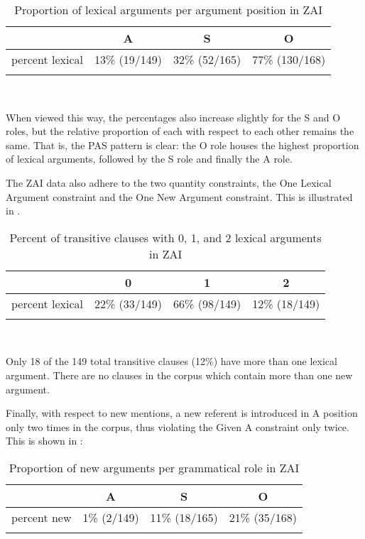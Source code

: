 \begin{table}

\caption{{Proportion of lexical arguments per argument position in ZAI}}
\begin{tabular}{ r  c  c  c }
\lsptoprule
 & A & S & O \\

\midrule
 percent lexical  &  13{\%} (19/149) &  32{\%} (52/165) &  77{\%} (130/168)  \\
  
\lspbottomrule
\end{tabular}\\
\label{proportionlexical}

\end{table}
When viewed this way, the percentages also increase slightly for the S and O roles, but the relative proportion of each with respect to each other remains the same. That is, the PAS pattern is clear: the O role houses the highest proportion of lexical arguments, followed by the S role and finally the A role.

The ZAI data also adhere to the two quantity constraints, the One Lexical Argument constraint and the One New Argument constraint. This is illustrated in .
\begin{table} [htp] 

\caption{{Percent of transitive clauses with 0, 1, and 2 lexical arguments in ZAI}}
\begin{tabular}{ r  c  c  c }
\lsptoprule
 & 0  & 1  & 2 \\

\midrule
percent lexical & 22{\%} (33/149) & 66{\%} (98/149) &  12{\%} (18/149)  \\
  
\lspbottomrule
\end{tabular}\\
\label{percenttrans}

\end{table}
Only 18 of the 149 total transitive clauses (12{\%}) have more than one lexical argument. There are no clauses in the corpus which contain more than one new argument. 

Finally, with respect to new mentions, a new referent is introduced in A position only two times in the corpus, thus violating the Given A constraint only twice. This is shown in :

\begin{table}

\caption{{Proportion of new arguments per grammatical role in ZAI}}
\begin{tabular}{ r  c  c  c }
\lsptoprule
 & A & S & O \\

\midrule
 percent new  &  1{\%} (2/149) &  11{\%} (18/165) & 21{\%} (35/168) \\
  
\lspbottomrule
\end{tabular}\\
\label{proportionnew}

\end{table}

